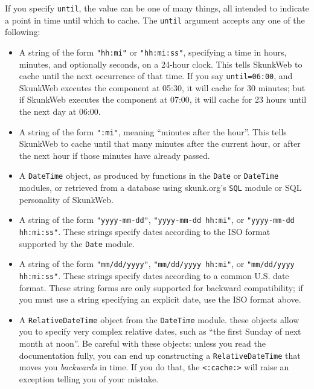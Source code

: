 \documentclass{manual}
\begin{document}
If you specify \texttt{until}, the value can be one
of many things, all intended to indicate a point in time
until which to cache. The \texttt{until} argument accepts
any one of the following:

\begin{itemize}
\item A string of the form \texttt{"hh:mi"} or
\texttt{"hh:mi:ss"}, specifying a time in hours, minutes,
and optionally seconds, on a 24-hour clock. This tells SkunkWeb
to cache until the next occurrence of that time. If you say
\texttt{until=06:00}, and SkunkWeb executes the component at 
05:30, it will cache for 30 minutes; but if SkunkWeb executes the 
component at 07:00, it will cache for 23 hours until the next
day at 06:00.

\item A string of the form \texttt{":mi"}, meaning 
``minutes after the hour''. This tells SkunkWeb to cache until
that many minutes after the current hour, or after the
next hour if those minutes have already passed.

\item A \texttt{DateTime} object, as produced by functions in the
\texttt{Date} or \texttt{DateTime} modules, or retrieved
from a database using skunk.org's \texttt{SQL} module
or SQL personality of SkunkWeb.

\item A string of the form \texttt{"yyyy-mm-dd"},
\texttt{"yyyy-mm-dd hh:mi"}, or \texttt{"yyyy-mm-dd hh:mi:ss"}.
These strings specify dates according to the ISO 
format supported by the \texttt{Date} module.

\item A string of the form \texttt{"mm/dd/yyyy"},
\texttt{"mm/dd/yyyy hh:mi"}, or \texttt{"mm/dd/yyyy hh:mi:ss"}.
These strings specify dates according to a common
U.S. date format. These string forms are only supported
for backward compatibility; if you must use a string
specifying an explicit date, use the ISO format above.

\item A \texttt{RelativeDateTime} object from the \texttt{DateTime}
module. these objects allow you to specify very complex
relative dates, such as ``the first Sunday of next month
at noon''. Be careful with these objects: unless you
read the documentation fully, you can end up constructing
a \texttt{RelativeDateTime} that moves you \emph{backwards} in time.
If you do that, the \texttt{<:cache:>} will raise
an exception telling you of your mistake.


\end{itemize}
\end{document}
